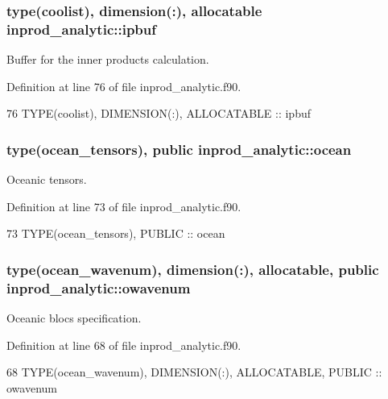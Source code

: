 \subsubsection[{\texorpdfstring{ipbuf}{ipbuf}}]{\setlength{\rightskip}{0pt plus 5cm}type({\bf coolist}), dimension(\+:), allocatable inprod\+\_\+analytic\+::ipbuf\hspace{0.3cm}{\ttfamily [private]}}\hypertarget{namespaceinprod__analytic_a6263b2bbddcdb63f1629be2c7ba9021d}{}\label{namespaceinprod__analytic_a6263b2bbddcdb63f1629be2c7ba9021d}


Buffer for the inner products calculation. 



Definition at line 76 of file inprod\+\_\+analytic.\+f90.


\begin{DoxyCode}
76   \textcolor{keywordtype}{TYPE}(coolist), \textcolor{keywordtype}{DIMENSION(:)}, \textcolor{keywordtype}{ALLOCATABLE} :: ipbuf
\end{DoxyCode}
\subsubsection[{\texorpdfstring{ocean}{ocean}}]{\setlength{\rightskip}{0pt plus 5cm}type({\bf ocean\+\_\+tensors}), public inprod\+\_\+analytic\+::ocean}\hypertarget{namespaceinprod__analytic_ac691a1258fb0a341e2ba5b4811be1c0b}{}\label{namespaceinprod__analytic_ac691a1258fb0a341e2ba5b4811be1c0b}


Oceanic tensors. 



Definition at line 73 of file inprod\+\_\+analytic.\+f90.


\begin{DoxyCode}
73   \textcolor{keywordtype}{TYPE}(ocean\_tensors), \textcolor{keywordtype}{PUBLIC} :: ocean
\end{DoxyCode}
\subsubsection[{\texorpdfstring{owavenum}{owavenum}}]{\setlength{\rightskip}{0pt plus 5cm}type({\bf ocean\+\_\+wavenum}), dimension(\+:), allocatable, public inprod\+\_\+analytic\+::owavenum}\hypertarget{namespaceinprod__analytic_a7273713c6b1a079e1c653e8b8d2fe089}{}\label{namespaceinprod__analytic_a7273713c6b1a079e1c653e8b8d2fe089}


Oceanic blocs specification. 



Definition at line 68 of file inprod\+\_\+analytic.\+f90.


\begin{DoxyCode}
68   \textcolor{keywordtype}{TYPE}(ocean\_wavenum), \textcolor{keywordtype}{DIMENSION(:)}, \textcolor{keywordtype}{ALLOCATABLE}, \textcolor{keywordtype}{PUBLIC} :: owavenum 
\end{DoxyCode}
